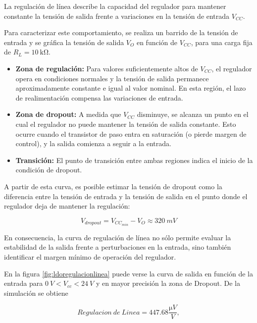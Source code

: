 \documentclass[]{article}
\begin{document}
	La regulación de línea describe la capacidad del regulador para mantener constante la tensión de salida frente a variaciones en la tensión de entrada \(V_{CC}\).
	
	Para caracterizar este comportamiento, se realiza un barrido de la tensión de entrada y se gráfica la tensión de salida \(V_O\) en función de \(V_{CC}\), para una carga fija de $R_L = \SI{10}{\kilo\ohm}$.
	
	\begin{itemize}
		\item \textbf{Zona de regulación:}  
		Para valores suficientemente altos de \(V_{CC}\), el regulador opera en condiciones normales y la tensión de salida permanece aproximadamente constante e igual al valor nominal. En esta región, el lazo de realimentación compensa las variaciones de entrada.
		
		\item \textbf{Zona de dropout:}  
		A medida que \(V_{CC}\) disminuye, se alcanza un punto en el cual el regulador no puede mantener la tensión de salida constante. Esto ocurre cuando el transistor de paso entra en saturación (o pierde margen de control), y la salida comienza a seguir a la entrada.
		
		\item \textbf{Transición:}  
		El punto de transición entre ambas regiones indica el inicio de la condición de dropout.
	\end{itemize}
	
	A partir de esta curva, es posible estimar la tensión de dropout como la diferencia entre la tensión de entrada y la tensión de salida en el punto donde el regulador deja de mantener la regulación:
	
	\[
	V_{dropout} = V_{{CC}_{min}} - V_O \approx \SI{320}{mV}
	\]
	
	En consecuencia, la curva de regulación de línea no sólo permite evaluar la estabilidad de la salida frente a perturbaciones en la entrada, sino también identificar el margen mínimo de operación del regulador.
	
	En la figura \ref{fig:ldoregulacionlinea} puede verse la curva de salida en función de la entrada para $\SI{0}{V} < V_{cc} < \SI{24}{V}$ y en mayor precisión la zona de Dropout. De la simulación se obtiene
	
	\begin{equation}
		Regulacion \ de \ Linea = \num{447.68} \frac{\si{\micro V}}{\si{V}},
	\end{equation}
	
\end{document}
